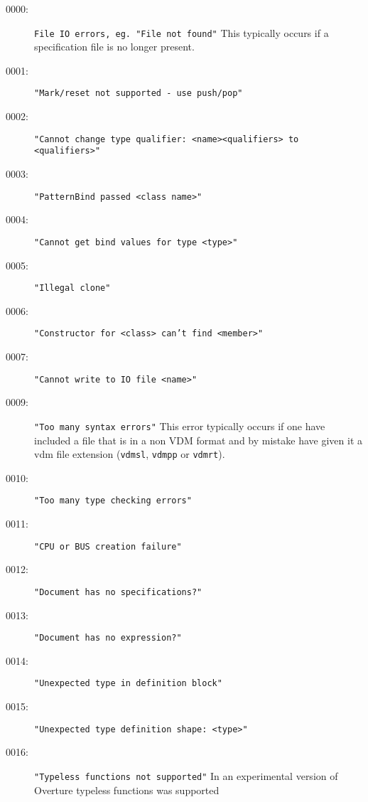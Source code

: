 %
%
%

\begin{description}
\item[0000:] \texttt{File IO errors, eg. "File not found"}  This
  typically occurs if a specification file is no longer present.
\item[0001:] \texttt{"Mark/reset not supported - use push/pop"}
\item[0002:] \texttt{"Cannot change type qualifier: <name><qualifiers> to <qualifiers>"}
\item[0003:] \texttt{"PatternBind passed <class name>"}
\item[0004:] \texttt{"Cannot get bind values for type <type>"}
\item[0005:] \texttt{"Illegal clone"}
\item[0006:] \texttt{"Constructor for <class> can't find <member>"}
\item[0007:] \texttt{"Cannot write to IO file <name>"}
\item[0009:] \texttt{"Too many syntax errors"}  This error typically
  occurs if one have included a file that is in a non VDM format and
  by mistake have given it a vdm file extension (\texttt{vdmsl},
  \texttt{vdmpp} or \texttt{vdmrt}).
\item[0010:] \texttt{"Too many type checking errors"}
\item[0011:] \texttt{"CPU or BUS creation failure"}
\item[0012:] \texttt{"Document has no specifications?"}
\item[0013:] \texttt{"Document has no expression?"}
\item[0014:] \texttt{"Unexpected type in definition block"}
\item[0015:] \texttt{"Unexpected type definition shape: <type>"}
\item[0016:] \texttt{"Typeless functions not supported"} In an
  experimental version of Overture typeless functions was supported

\end{description}
